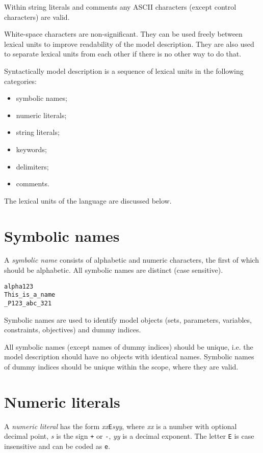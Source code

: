 \documentclass[11pt]{report}
\def\para#1{\noindent{\bf#1}}
\begin{document}
Within string literals and comments any ASCII characters (except
control characters) are valid.

White-space characters are non-significant. They can be used freely
between lexical units to improve readability of the model description.
They are also used to separate lexical units from each other if there
is no other way to do that.

Syntactically model description is a sequence of lexical units in the
following categories:

\begin{itemize}
\item symbolic names;
\item numeric literals;
\item string literals;
\item keywords;
\item delimiters;
\item comments.
\end{itemize}

The lexical units of the language are discussed below.

\newpage

\section{Symbolic names}

A {\it symbolic name} consists of alphabetic and numeric characters,
the first of which should be alphabetic. All symbolic names are
distinct (case sensitive).

\para{Examples}

\begin{verbatim}
alpha123
This_is_a_name
_P123_abc_321
\end{verbatim}

Symbolic names are used to identify model objects (sets, parameters,
variables, constraints, objectives) and dummy indices.

All symbolic names (except names of dummy indices) should be unique,
i.e. the model description should have no objects with identical names.
Symbolic names of dummy indices should be unique within the scope,
where they are valid.

\section{Numeric literals}

A {\it numeric literal} has the form {\it xx}{\tt E}{\it syy}, where
{\it xx} is a number with optional decimal point, {\it s} is the sign
{\tt+} or {\tt-}, {\it yy} is a decimal exponent. The letter {\tt E} is
case insensitive and can be coded as {\tt e}.
\end{document}
